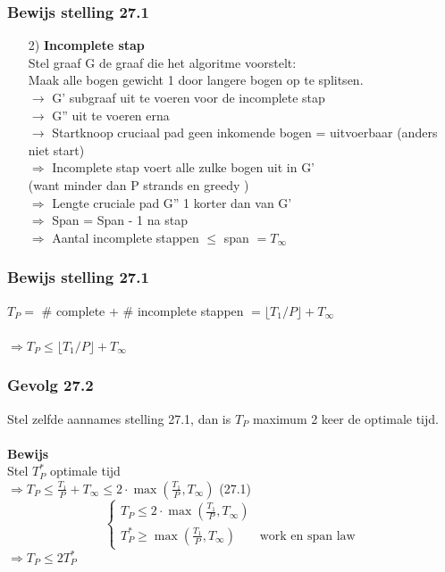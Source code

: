 \documentclass
   [kulak] %
   {kulakbeamer}
\begin{document}
\begin{frame}
	\frametitle{Bewijs stelling 27.1}
	\begin{itemize}
		\item[2)] \textbf{Incomplete stap}\\ 
		Stel graaf G de graaf die het algoritme voorstelt:
		\\ Maak alle bogen gewicht 1 door langere bogen op te splitsen.\\
		\pause
		$\rightarrow$ G' subgraaf uit te voeren voor de incomplete stap  \\
		$\rightarrow$ G'' uit te voeren erna\\
		$\rightarrow$ Startknoop cruciaal pad geen inkomende bogen = uitvoerbaar (anders niet start)\\
		\pause
		$\Rightarrow$ Incomplete stap voert alle zulke bogen uit in G' \\(want minder dan P strands en greedy ) \\
		$\Rightarrow$ Lengte cruciale pad G'' 1 korter dan van G'\\
		$\Rightarrow$ Span = Span - 1 na stap\\
		$\Rightarrow$ Aantal incomplete stappen $\leqslant$ span $= T_\infty$
	\end{itemize}
\end{frame}

\begin{frame}
	\frametitle{Bewijs stelling 27.1}
	
	$T_P =$ \# complete + \# incomplete stappen $= \lfloor T_1 /P\rfloor + T_\infty$ \\~\\
	$\Rightarrow T_P \leqslant \lfloor T_1 /P\rfloor + T_\infty$\\
	\flushright{$\Box$}
	
\end{frame}

\begin{frame}
	\frametitle{Gevolg 27.2}
	Stel zelfde aannames stelling 27.1, dan is $T_P$ maximum 2 keer de optimale tijd. \pause \\~\\
	\textbf{Bewijs}\\
	Stel $T_P^*$ optimale tijd\\
	$\Rightarrow T_P  \leqslant \frac{T_1}{P} + T_\infty \leqslant 2\cdot\max(\frac{T_1}{P} , T_\infty)$ (27.1)
	\[
		\begin{cases}
		 T_P  \leqslant 2\cdot\max(\frac{T_1}{P} , T_\infty) & \\
		 T_P^* \geqslant \max(\frac{T_1}{P} , T_\infty) & \text{work en span law}
		\end{cases}
	\]
	$\Rightarrow T_P \leqslant 2T_P^*$
	\flushright{$\Box$}
\end{frame}
\end{document}
